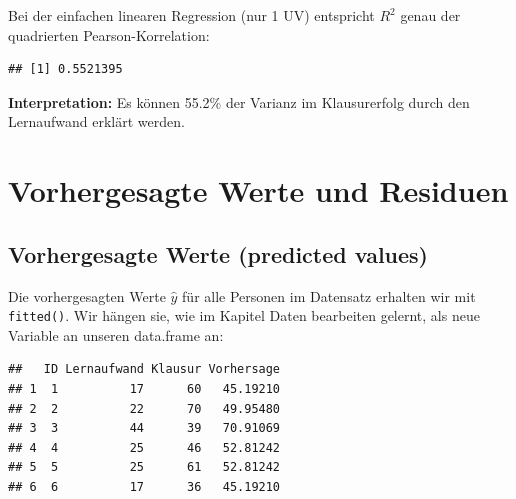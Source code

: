 \documentclass[
]{book}
\newenvironment{Shaded}{\begin{snugshade}}{\end{snugshade}}
\newcommand{\DecValTok}[1]{\textcolor[rgb]{0.00,0.00,0.81}{#1}}
\newcommand{\FunctionTok}[1]{\textcolor[rgb]{0.13,0.29,0.53}{\textbf{#1}}}
\newcommand{\NormalTok}[1]{#1}
\newcommand{\OtherTok}[1]{\textcolor[rgb]{0.56,0.35,0.01}{#1}}
\newcommand{\SpecialCharTok}[1]{\textcolor[rgb]{0.81,0.36,0.00}{\textbf{#1}}}
\begin{document}
Bei der einfachen linearen Regression (nur 1 UV) entspricht \(R^2\) genau der quadrierten Pearson-Korrelation:

\begin{Shaded}
\end{Shaded}

\begin{verbatim}
## [1] 0.5521395
\end{verbatim}

\textbf{Interpretation:} Es können 55.2\% der Varianz im Klausurerfolg durch den Lernaufwand erklärt werden.

\section{Vorhergesagte Werte und Residuen}\label{vorhergesagte-werte-und-residuen}

\subsection{Vorhergesagte Werte (predicted values)}\label{vorhergesagte-werte-predicted-values}

Die vorhergesagten Werte \(\hat{y}\) für alle Personen im Datensatz erhalten wir mit \texttt{fitted()}. Wir hängen sie, wie im Kapitel Daten bearbeiten gelernt, als neue Variable an unseren data.frame an:

\begin{Shaded}
\end{Shaded}

\begin{verbatim}
##   ID Lernaufwand Klausur Vorhersage
## 1  1          17      60   45.19210
## 2  2          22      70   49.95480
## 3  3          44      39   70.91069
## 4  4          25      46   52.81242
## 5  5          25      61   52.81242
## 6  6          17      36   45.19210
\end{verbatim}
\end{document}
